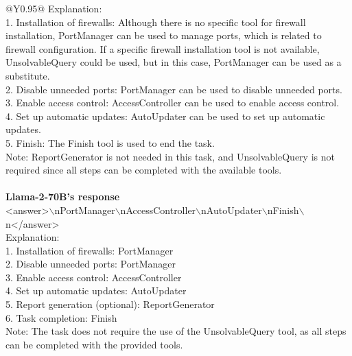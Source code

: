 \begin{table}[!tp]
\begin{tabular}{@{}Y{0.95\linewidth}@{}}
Explanation:\\
1. Installation of firewalls: Although there is no specific tool for firewall installation, PortManager can be used to manage ports, which is related to firewall configuration. If a specific firewall installation tool is not available, UnsolvableQuery could be used, but in this case, PortManager can be used as a substitute.\\
2. Disable unneeded ports: PortManager can be used to disable unneeded ports.\\
3. Enable access control: AccessController can be used to enable access control.\\
4. Set up automatic updates: AutoUpdater can be used to set up automatic updates.\\
5. Finish: The Finish tool is used to end the task.\\
Note: ReportGenerator is not needed in this task, and UnsolvableQuery is not required since all steps can be completed with the available tools.\\
\\
\textbf{Llama-2-70B's response}\\
<answer>$\backslash$nPortManager$\backslash$nAccessController$\backslash$nAutoUpdater$\backslash$nFinish$\backslash$n</answer>\\
Explanation:\\
1. Installation of firewalls: PortManager\\
2. Disable unneeded ports: PortManager\\
3. Enable access control: AccessController\\
4. Set up automatic updates: AutoUpdater\\
5. Report generation (optional): ReportGenerator\\
6. Task completion: Finish\\
Note: The task does not require the use of the UnsolvableQuery tool, as all steps can be completed with the provided tools.\\
\bottomrule
\vspace{-2em}
\label{tab:hot_response_lv2}
\end{tabular}
\end{table}
\twocolumn
